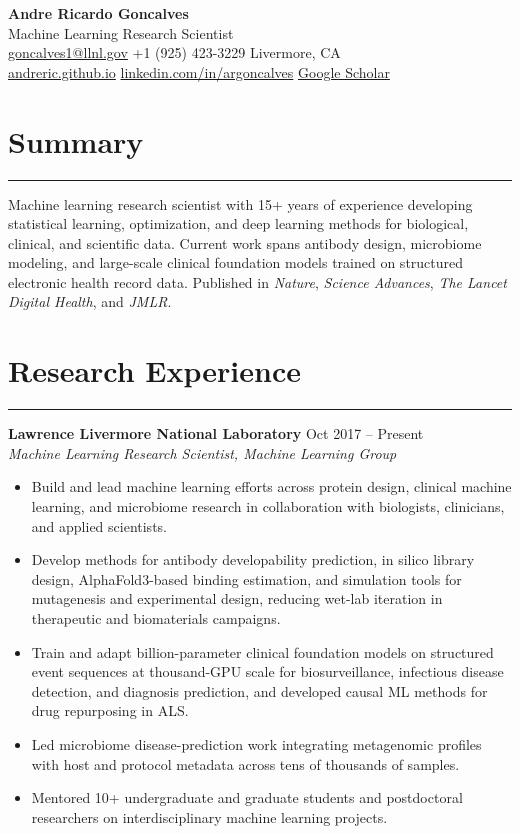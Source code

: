 \documentclass[10pt,letterpaper]{article}
\newcommand{\sectionrule}{\vspace{-0.1em}\hrule\vspace{0.25em}}
\newcommand{\entry}[4]{%
	\textbf{#1} \hfill #2\\
	\textit{#3}\nopagebreak\vspace{-0.55em}
	#4\vspace{0.15em}
}
\begin{document}
	
	{\LARGE \textbf{Andre Ricardo Goncalves}}\\[0.25em]
	Machine Learning Research Scientist\\
	\href{mailto:goncalves1@llnl.gov}{goncalves1@llnl.gov} \textbar{} +1 (925) 423-3229 \textbar{} Livermore, CA\\
	\href{https://andreric.github.io}{andreric.github.io} \textbar{} \href{https://linkedin.com/in/argoncalves}{linkedin.com/in/argoncalves} \textbar{} \href{https://scholar.google.com/citations?user=pn7hL2cAAAAJ&hl=en}{Google Scholar}
	
	\section*{Summary}
	\sectionrule
	Machine learning research scientist with 15+ years of experience developing statistical learning, optimization, and deep learning methods for biological, clinical, and scientific data. Current work spans antibody design, microbiome modeling, and large-scale clinical foundation models trained on structured electronic health record data. Published in \textit{Nature}, \textit{Science Advances}, \textit{The Lancet Digital Health}, and \textit{JMLR}.
	
	\section*{Research Experience}
	\sectionrule
	
	\entry{Lawrence Livermore National Laboratory}{Oct 2017 -- Present}{Machine Learning Research Scientist, Machine Learning Group}{
		\begin{itemize}
			\item Build and lead machine learning efforts across protein design, clinical machine learning, and microbiome research in collaboration with biologists, clinicians, and applied scientists.
			\item Develop methods for antibody developability prediction, in silico library design, AlphaFold3-based binding estimation, and simulation tools for mutagenesis and experimental design, reducing wet-lab iteration in therapeutic and biomaterials campaigns.
			\item Train and adapt billion-parameter clinical foundation models on structured event sequences at thousand-GPU scale for biosurveillance, infectious disease detection, and diagnosis prediction, and developed causal ML methods for drug repurposing in ALS.
			\item Led microbiome disease-prediction work integrating metagenomic profiles with host and protocol metadata across tens of thousands of samples.
			\item Mentored 10+ undergraduate and graduate students and postdoctoral researchers on interdisciplinary machine learning projects.
	\end{itemize}}
	
\end{document}
